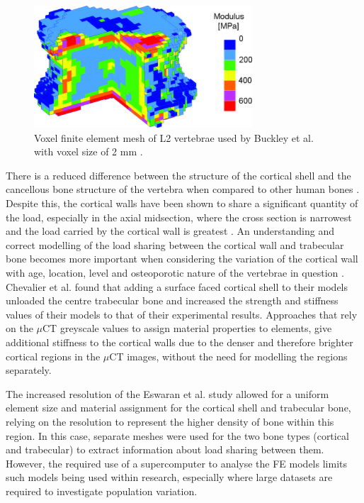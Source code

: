 \begin{figure}[ht!]

\centering
  \includegraphics[width=3.20764in,height=1.79236in]{images/voxelFEMesh.png}
  \caption{Voxel finite element mesh of L2 vertebrae used by Buckley et
al. with voxel size of 2 mm \cite{Buckley2006}.}
\label{fig:buckleymesh}
\end{figure}


There is a reduced difference between the structure of the cortical shell and the
cancellous bone structure of the vertebra when compared to other human
bones \cite{Eswaran2005}. Despite this, the cortical walls have been shown to
share a significant quantity of the load, especially in the axial
midsection, where the cross section is narrowest and the load carried by
the cortical wall is greatest \cite{Eswaran2005}. An understanding and correct
modelling of the load sharing between the cortical wall and trabecular
bone becomes more important when considering the variation of the
cortical wall with age, location, level and osteoporotic nature of the
vertebrae in question \cite{Ritzel1997}. Chevalier et al. \cite{Chevalier2009}
found
that
adding a surface faced cortical shell to their models unloaded the
centre trabecular bone and increased the strength and stiffness values
of their models to that of their experimental results. Approaches that
rely on the $\mu$CT greyscale values to assign material properties to
elements, give additional stiffness to the cortical walls due to the
denser and therefore brighter cortical regions in the $\mu$CT images,
without the need for modelling the regions separately.

The increased resolution of the Eswaran et al. \cite{Eswaran2007} study allowed
for a uniform element size and material assignment for the cortical
shell and trabecular bone, relying on the resolution to represent the
higher density of bone within this region. In this case, separate meshes
were used for the two bone types (cortical and trabecular) to extract
information about load sharing between them. However, the required use
of a supercomputer to analyse the FE models limits such models being
used within research, especially where large datasets are required to
investigate population variation.

